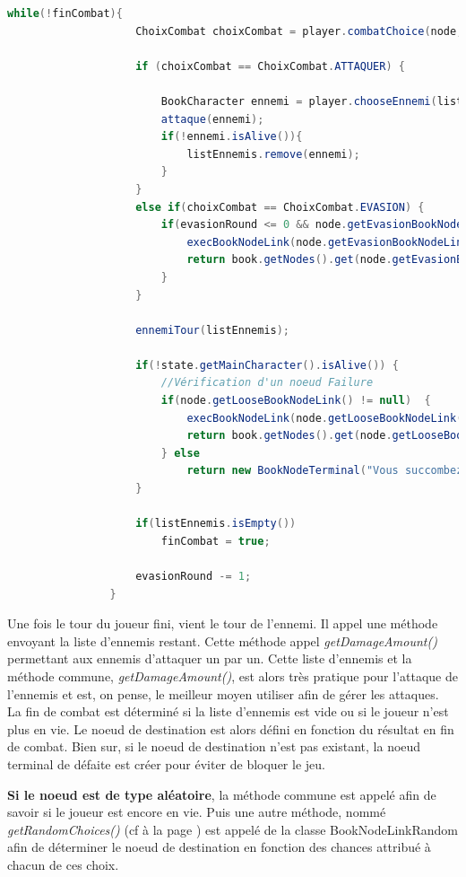 			\begin{lstlisting}[gobble=16, language=java, caption=JeuCombat]
				while(!finCombat){
					ChoixCombat choixCombat = player.combatChoice(node, evasionRound, state);

					if (choixCombat == ChoixCombat.ATTAQUER) {

						BookCharacter ennemi = player.chooseEnnemi(listEnnemis);
						attaque(ennemi);
						if(!ennemi.isAlive()){
							listEnnemis.remove(ennemi);
						}
					}
					else if(choixCombat == ChoixCombat.EVASION) {
						if(evasionRound <= 0 && node.getEvasionBookNodeLink() != null){
							execBookNodeLink(node.getEvasionBookNodeLink());
							return book.getNodes().get(node.getEvasionBookNodeLink().getDestination());
						}
					}

					ennemiTour(listEnnemis);

					if(!state.getMainCharacter().isAlive()) {
						//Vérification d'un noeud Failure
						if(node.getLooseBookNodeLink() != null)  {
							execBookNodeLink(node.getLooseBookNodeLink());
							return book.getNodes().get(node.getLooseBookNodeLink().getDestination());
						} else
							return new BookNodeTerminal("Vous succombez à vos blessures", BookNodeStatus.FAILURE);
					}

					if(listEnnemis.isEmpty())
						finCombat = true;

					evasionRound -= 1;
				}
			\end{lstlisting}

			Une fois le tour du joueur fini, vient le tour de l'ennemi. Il appel une méthode envoyant la liste d'ennemis restant. Cette méthode appel \textit{getDamageAmount()} permettant aux ennemis d'attaquer un par un. Cette liste d'ennemis et la méthode commune, \textit{getDamageAmount()}, est alors très pratique pour l'attaque de l'ennemis et est, on pense, le meilleur moyen utiliser afin de gérer les attaques.\\

			La fin de combat est déterminé si la liste d'ennemis est vide ou si le joueur n'est plus en vie. Le noeud de destination est alors défini en fonction du résultat en fin de combat. Bien sur, si le noeud de destination n'est pas existant, la noeud terminal de défaite est créer pour éviter de bloquer le jeu.

			\textbf{Si le noeud est de type aléatoire}, la méthode commune est appelé afin de savoir si le joueur est encore en vie. Puis une autre méthode, nommé \textit{getRandomChoices()} (cf  à la page \pageref{lst:getRandomChoices}) est appelé de la classe BookNodeLinkRandom afin de déterminer le noeud de destination en fonction des chances attribué à chacun de ces choix.

